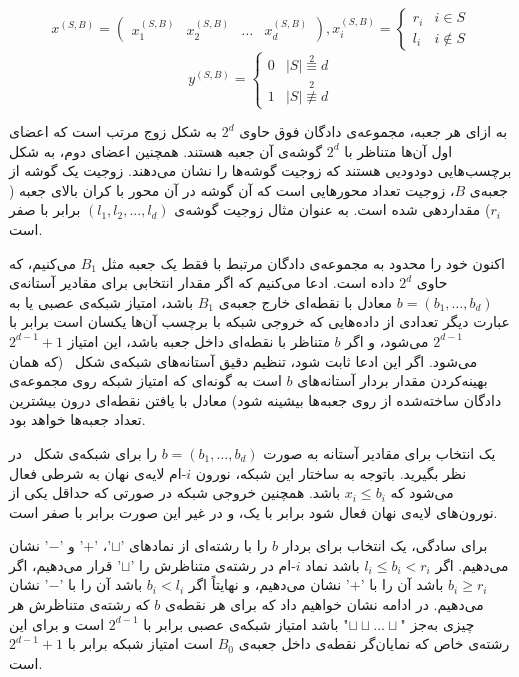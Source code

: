 \begin{equation}
	x^{(S, B)} = \begin{pmatrix} x^{(S, B)}_1 & x^{(S, B)}_2 & \hdots & x^{(S, B)}_d\end{pmatrix}, x^{(S, B)}_i = \begin{cases}
	r_i & i \in S\\
	l_i & i \notin S
\end{cases} \label{eq:xs}
\end{equation}
\begin{equation}
 	y^{(S, B)} = \begin{cases}
	0 & |S| \overset{2}{\equiv} d\\
	1 &  |S| \overset{2}{\not\equiv} d
\end{cases} \label{eq:ys}
\end{equation}

به ازای هر جعبه، مجموعه‌ی دادگان فوق حاوی $2^d$ به شکل زوج مرتب است که اعضای اول آن‌ها متناظر با $2^d$ گوشه‌ی آن جعبه هستند. همچنین اعضای دوم، به شکل برچسب‌هایی دودودیی هستند که زوجیت گوشه‌ها را نشان می‌دهند. زوجیت یک گوشه از جعبه‌ی $B$، زوجیت تعداد محورهایی است که آن گوشه در آن محور با کران بالای جعبه ($r_i$) مقداردهی شده است. به عنوان مثال زوجیت گوشه‌ی $(l_1, l_2, ..., l_d)$ برابر با صفر است.

اکنون خود را محدود به مجموعه‌ی دادگان مرتبط با فقط یک جعبه مثل $B_1$ می‌کنیم، که حاوی $2^d$ داده است. ادعا می‌کنیم که اگر مقدار انتخابی برای مقادیر آستانه‌ی
$b = (b_1, \dots, b_d)$
معادل با نقطه‌ای خارج جعبه‌ی $B_1$ باشد، امتیاز شبکه‌ی عصبی یا به عبارت دیگر تعدادی از داده‌هایی که خروجی شبکه با برچسب آن‌ها یکسان است برابر با
$2^{d-1}$
می‌شود، و اگر $b$ متناظر با نقطه‌ای داخل جعبه باشد، این امتیاز
$2^{d-1}+1$
می‌شود. اگر این ادعا ثابت شود، تنظیم دقیق آستانه‌های شبکه‌ی شکل~ (که همان بهینه‌کردن مقدار بردار آستانه‌های $b$ است به گونه‌ای که امتیاز شبکه روی مجموعه‌ی دادگان ساخته‌شده از روی جعبه‌ها بیشینه شود) معادل با یافتن نقطه‌ای درون بیشترین تعداد جعبه‌ها خواهد بود.

یک انتخاب برای مقادیر آستانه به صورت
$b = (b_1, \dots, b_d)$
را برای شبکه‌ی شکل~ در نظر بگیرید. باتوجه به ساختار این شبکه، نورون $i$-ام لایه‌ی نهان به شرطی فعال می‌شود که
$x_i \leq b_i$
باشد. همچنین خروجی شبکه در صورتی که حداقل یکی از نورون‌های لایه‌ی نهان فعال شود برابر با یک، و در غیر این صورت برابر با صفر است.

برای سادگی، یک انتخاب برای بردار $b$ را با رشته‌ای از نمادهای '$\sqcup$'، '$+$' و '$-$' نشان می‌دهیم. اگر $l_i \leq b_i < r_i$ باشد نماد $i$-ام در رشته‌ی متناظرش را '$\sqcup$' قرار می‌دهیم، اگر $b_i \geq r_i$ باشد آن را با '$+$' نشان می‌دهیم، و نهایتاً اگر $b_i < l_i$ باشد آن را با '$-$' نشان می‌دهیم. در ادامه نشان خواهیم داد که برای هر نقطه‌ی $b$ که رشته‌ی متناظرش هر چیزی به‌جز "$\sqcup\sqcup ... \sqcup$" باشد امتیاز شبکه‌ی عصبی برابر با $2^{d-1}$ است و برای این رشته‌ی خاص که نمایان‌گر نقطه‌ی داخل جعبه‌ی $B_0$ است امتیاز شبکه برابر با
$2^{d-1}+1$
است.


